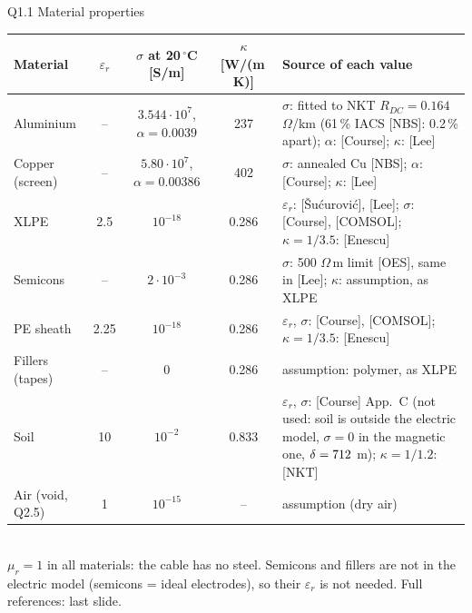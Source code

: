\documentclass[aspectratio=169,10pt]{beamer}
\begin{document}
\begin{frame}{Q1.1 Material properties}
\scriptsize\centering
\begin{tabular}{@{}lcccp{6.2cm}@{}}\toprule
Material & $\varepsilon_r$ & $\sigma$ at 20\,$^\circ$C [S/m] & $\kappa$ [W/(m\,K)] & Source of each value\\\midrule
Aluminium & -- & $3.544\cdot10^7$, $\alpha=0.0039$ & 237 & $\sigma$: fitted to NKT $R_{DC}=0.164$ $\Omega$/km (61\,\% IACS [NBS]: 0.2\,\% apart); $\alpha$: [Course]; $\kappa$: [Lee]\\
Copper (screen) & -- & $5.80\cdot10^7$, $\alpha=0.00386$ & 402 & $\sigma$: annealed Cu [NBS]; $\alpha$: [Course]; $\kappa$: [Lee]\\
XLPE & 2.5 & $10^{-18}$ & 0.286 & $\varepsilon_r$: [\v{S}u\'{c}urovi\'{c}], [Lee]; $\sigma$: [Course], [COMSOL]; $\kappa=1/3.5$: [Enescu]\\
Semicons & -- & $2\cdot10^{-3}$ & 0.286 & $\sigma$: 500 $\Omega$\,m limit [OES], same in [Lee]; $\kappa$: assumption, as XLPE\\
PE sheath & 2.25 & $10^{-18}$ & 0.286 & $\varepsilon_r$, $\sigma$: [Course], [COMSOL]; $\kappa=1/3.5$: [Enescu]\\
Fillers (tapes) & -- & 0 & 0.286 & assumption: polymer, as XLPE\\
Soil & 10 & $10^{-2}$ & 0.833 & $\varepsilon_r$, $\sigma$: [Course] App.~C (not used: soil is outside the electric model, $\sigma=0$ in the magnetic one, $\delta=712$ m); $\kappa=1/1.2$: [NKT]\\
Air (void, Q2.5) & 1 & $10^{-15}$ & -- & assumption (dry air)\\\bottomrule
\end{tabular}\\[6pt]
{\footnotesize $\mu_r=1$ in all materials: the cable has no steel. Semicons and fillers are not in the electric model
(semicons = ideal electrodes), so their $\varepsilon_r$ is not needed. Full references: last slide.}
\end{frame}
\end{document}
